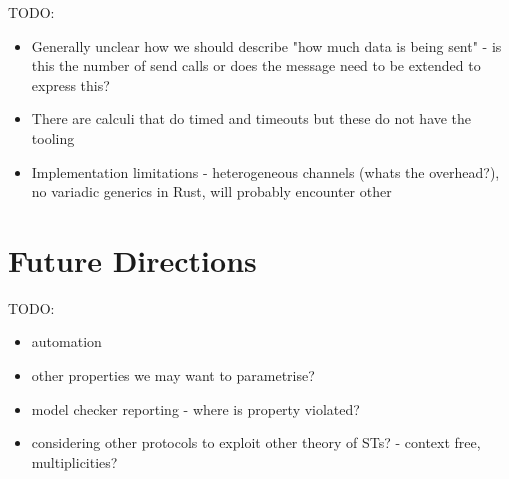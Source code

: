 \documentclass{article}
\newcommand{\todo}[1]{}
\renewcommand{\todo}[1]{{\color{red} TODO: {#1}}}
\begin{document}
\todo{
    \begin{itemize}
        \item Generally unclear how we should describe "how much data is being sent" - is this the number of send calls or does the message need to be extended to express this?
        \item There are calculi that do timed and timeouts but these do not have the tooling
        \item Implementation limitations - heterogeneous channels (whats the overhead?), no variadic generics in Rust, will probably encounter other
    \end{itemize}
}

\section{Future Directions}

\todo{
    \begin{itemize}
        \item automation
        \item other properties we may want to parametrise?
        \item model checker reporting - where is property violated?
        \item considering other protocols to exploit other theory of STs? - context free, multiplicities?
    \end{itemize}
}

\medskip
\nocite{*}
\printbibliography
\end{document}
